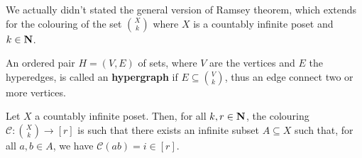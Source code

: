 We actually didn't stated the general version of Ramsey theorem, which extends
for the colouring of the set \(\binom{X}{k}\) where \(X\) is a countably infinite
poset and \(k \in \mathbf{N}\).

\begin{definition}[Hypergraph]
    An ordered pair \(H = (V, E)\) of sets, where \(V\) are the vertices and
    \(E\) the hyperedges, is called an \textbf{hypergraph} if \(E \subseteq
    \binom{V}{k}\), thus an edge connect two or more vertices.
\end{definition}

\begin{theorem}
    Let \(X\) a countably infinite poset. Then, for all \(k, r \in \mathbf{N}\), the
    colouring \(\mathcal{C} : \binom{X}{k} \to [r]\) is such that there exists an
    infinite subset \(A \subseteq X\) such that, for all \(a, b \in A\), we
    have \(\mathcal{C}(a b) = i \in [r]\).
\end{theorem}

